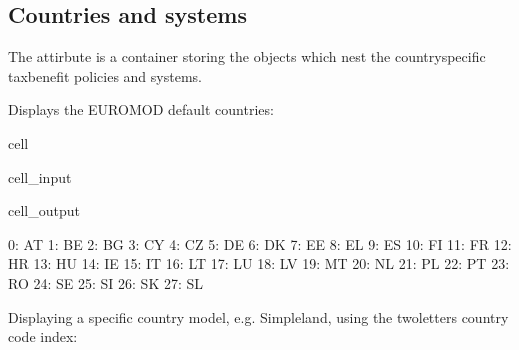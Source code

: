 \documentclass[letterpaper,10pt,english]{sphinxmanual}
\begin{document}
\subsection{Countries and systems}
\label{\detokenize{getstarted:countries-and-systems}}
\sphinxAtStartPar
The  attirbute is a container storing the  objects which nest the country\sphinxhyphen{}specific tax\sphinxhyphen{}benefit policies and systems.

\sphinxAtStartPar
Displays the EUROMOD default countries:

\begin{sphinxuseclass}{cell}
\begin{sphinxuseclass}{cell_input}
\begin{sphinxVerbatim}[commandchars=\\\{\}]
\end{sphinxVerbatim}

\end{sphinxuseclass}
\begin{sphinxuseclass}{cell_output}
\begin{sphinxVerbatim}[commandchars=\\\{\}]
0: AT 
1: BE 
2: BG 
3: CY 
4: CZ 
5: DE 
6: DK 
7: EE 
8: EL 
9: ES 
10: FI
11: FR
12: HR
13: HU
14: IE
15: IT
16: LT
17: LU
18: LV
19: MT
20: NL
21: PL
22: PT
23: RO
24: SE
25: SI
26: SK
27: SL
\end{sphinxVerbatim}

\end{sphinxuseclass}
\end{sphinxuseclass}
\sphinxAtStartPar
Displaying a specific country model, e.g. Simpleland, using the two\sphinxhyphen{}letters country code index:
\end{document}
